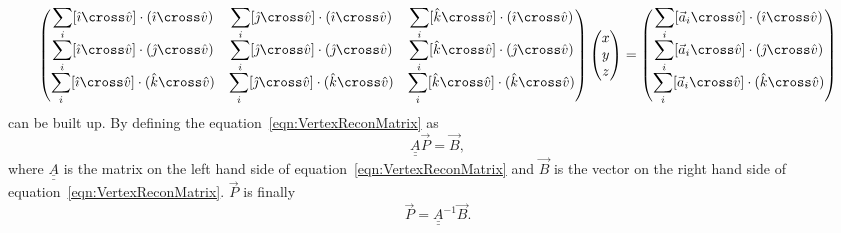 \begin{equation}
  \begin{pmatrix}
    \displaystyle\sum_i [\hat{\imath} \cross \hat{v}] \cdot (\hat{\imath} \cross \hat{v}) & \displaystyle\sum_i [\hat{\jmath} \cross \hat{v}] \cdot (\hat{\imath} \cross \hat{v}) & \displaystyle\sum_i [\hat{k} \cross \hat{v}] \cdot (\hat{\imath} \cross \hat{v}) \\
    \displaystyle\sum_i [\hat{\imath} \cross \hat{v}] \cdot (\hat{\jmath} \cross \hat{v}) & \displaystyle\sum_i [\hat{\jmath} \cross \hat{v}] \cdot (\hat{\jmath} \cross \hat{v}) & \displaystyle\sum_i [\hat{k} \cross \hat{v}] \cdot (\hat{\jmath} \cross \hat{v}) \\ 
    \displaystyle\sum_i [\hat{\imath} \cross \hat{v}] \cdot (\hat{k} \cross \hat{v}) & \displaystyle\sum_i [\hat{\jmath} \cross \hat{v}] \cdot (\hat{k} \cross \hat{v}) & \displaystyle\sum_i [\hat{k} \cross \hat{v}] \cdot (\hat{k} \cross \hat{v}) 
  \end{pmatrix}
  \begin{pmatrix}
   x \\
   y \\
   z
  \end{pmatrix}
  =
  \begin{pmatrix}
    \displaystyle\sum_i [\vec{a}_i \cross \hat{v}] \cdot (\hat{\imath} \cross \hat{v}) \\
    \displaystyle\sum_i [\vec{a}_i \cross \hat{v}] \cdot (\hat{\jmath} \cross \hat{v}) \\
    \displaystyle\sum_i [\vec{a}_i \cross \hat{v}] \cdot (\hat{k} \cross \hat{v})
  \end{pmatrix}
  \label{eqn:VertexReconMatrix}
\end{equation}
can be built up.  By defining the equation~\ref{eqn:VertexReconMatrix} as
\begin{equation}
  \underline{\underline{A}} \vec{P} = \vec{B},
  \label{eqn:VertexReconMatrixSimple}
\end{equation}
where $\underline{\underline{A}}$ is the matrix on the left hand side of equation~\ref{eqn:VertexReconMatrix} and $\vec{B}$ is the vector on the right hand side of equation~\ref{eqn:VertexReconMatrix}.  $\vec{P}$ is finally
\begin{equation}
  \vec{P} = \underline{\underline{A}}^{-1} \vec{B}.
  \label{eqn:VertexReconMatrixSolution}
\end{equation}

